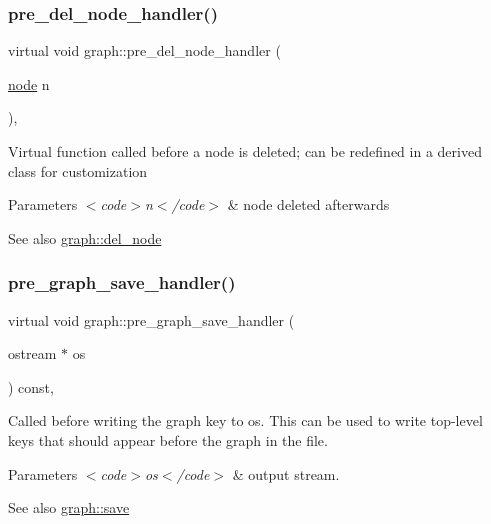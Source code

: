 \subsubsection{\texorpdfstring{pre\+\_\+del\+\_\+node\+\_\+handler()}{pre\_del\_node\_handler()}}
{\footnotesize\ttfamily virtual void graph\+::pre\+\_\+del\+\_\+node\+\_\+handler (\begin{DoxyParamCaption}\item[{\mbox{\hyperlink{classnode}{node}}}]{n }\end{DoxyParamCaption})\hspace{0.3cm}{\ttfamily [inline]}, {\ttfamily [virtual]}}

Virtual function called before a node is deleted; can be redefined in a derived class for customization


\begin{DoxyParams}{Parameters}
{\em $<$code$>$n$<$/code$>$} & node deleted afterwards \\
\hline
\end{DoxyParams}
\begin{DoxySeeAlso}{See also}
\mbox{\hyperlink{classgraph_a8bdc09d5b9ac4bd26586b054d8fcbe91}{graph\+::del\+\_\+node}} 
\end{DoxySeeAlso}
\mbox{\label{classgraph_ab4bf5526925f52aa6967a563b4abbd97}} 
\subsubsection{\texorpdfstring{pre\+\_\+graph\+\_\+save\+\_\+handler()}{pre\_graph\_save\_handler()}}
{\footnotesize\ttfamily virtual void graph\+::pre\+\_\+graph\+\_\+save\+\_\+handler (\begin{DoxyParamCaption}\item[{ostream $\ast$}]{os }\end{DoxyParamCaption}) const\hspace{0.3cm}{\ttfamily [inline]}, {\ttfamily [virtual]}}

Called before writing the graph key to {\ttfamily os}. This can be used to write top-\/level keys that should appear before the graph in the file.


\begin{DoxyParams}{Parameters}
{\em $<$code$>$os$<$/code$>$} & output stream. \\
\hline
\end{DoxyParams}
\begin{DoxySeeAlso}{See also}
\mbox{\hyperlink{classgraph_a7bd0712a528249d1585085a64ac3e661}{graph\+::save}} 
\end{DoxySeeAlso}
\mbox{\label{classgraph_ad755188a78a38f733cf362d4e8dd47f8}} 
